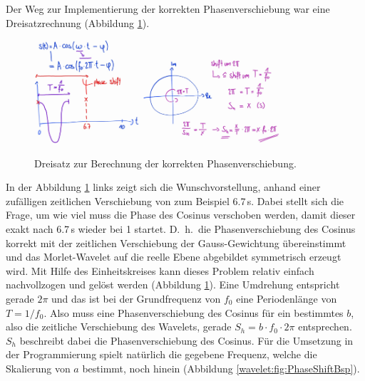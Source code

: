 Der Weg zur Implementierung der korrekten Phasenverschiebung war
eine Dreisatzrechnung (Abbildung \ref{wavelet:fig:PhaseCalc}).
\begin{figure}
	\centering
	\includegraphics[width=0.35\textwidth]{papers/wavelets/images/10-1_PhaseCalc1.png}
	\includegraphics[width=0.45\textwidth]{papers/wavelets/images/10-2_PhaseCalc2.png}
	\caption{Dreisatz zur Berechnung der korrekten Phasenverschiebung.}
	\label{wavelet:fig:PhaseCalc}
\end{figure}
In der Abbildung \ref{wavelet:fig:PhaseCalc} links zeigt sich die
Wunschvorstellung, anhand einer zufälligen zeitlichen Verschiebung
von zum Beispiel 6.7\,s.
Dabei stellt sich die Frage, um wie viel muss die Phase des Cosinus
verschoben werden, damit dieser exakt nach 6.7\,s wieder bei 1 startet.
D.~h.~die Phasenverschiebung des Cosinus korrekt mit der zeitlichen
Verschiebung der Gauss-Gewichtung übereinstimmt und das Morlet-Wavelet
auf die reelle Ebene abgebildet symmetrisch erzeugt wird.
Mit Hilfe des Einheitskreises kann dieses Problem relativ einfach
nachvollzogen und gelöst werden (Abbildung \ref{wavelet:fig:PhaseCalc}).
Eine Umdrehung entspricht gerade $2\pi$ und das ist bei der
Grundfrequenz von $f_0$ eine Periodenlänge von $T=1/f_0$. Also muss
eine Phasenverschiebung des Cosinus für ein bestimmtes $b$, also
die zeitliche Verschiebung des Wavelets, gerade $S_h=b\cdot f_0\cdot
2\pi$ entsprechen. $S_h$ beschreibt dabei die Phasenverschiebung
des Cosinus.
Für die Umsetzung in der Programmierung spielt natürlich die gegebene
Frequenz, welche die Skalierung von $a$ bestimmt, noch hinein
(Abbildung \ref{wavelet:fig:PhaseShiftBsp}).

